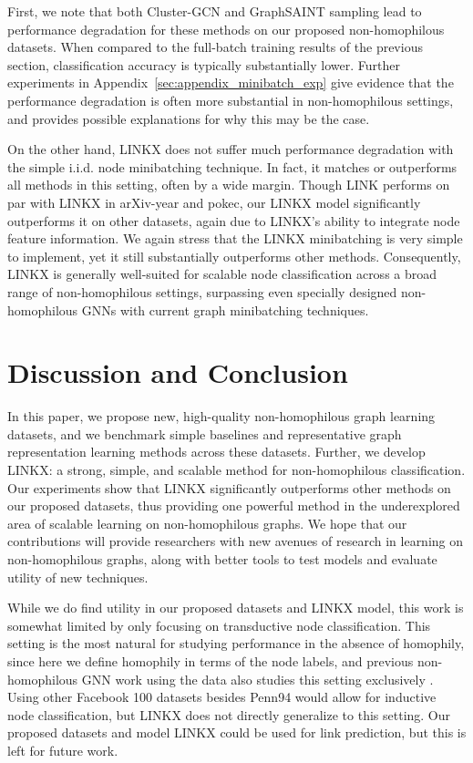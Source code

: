 \documentclass{article}
\begin{document}
First, we note that both Cluster-GCN and GraphSAINT sampling lead to performance degradation for these methods on our proposed non-homophilous datasets. When compared to the full-batch training results of the previous section, classification accuracy is typically substantially lower. Further experiments in Appendix~\ref{sec:appendix_minibatch_exp} give evidence that the performance degradation is often more substantial in non-homophilous settings, and provides possible explanations for why this may be the case.

On the other hand, LINKX does not suffer much performance degradation with the simple i.i.d. node minibatching technique. In fact, it matches or outperforms all methods in this setting, often by a wide margin. Though LINK performs on par with LINKX in arXiv-year and pokec, our LINKX model significantly outperforms it on other datasets, again due to LINKX's ability to integrate node feature information. We again stress that the LINKX minibatching is very simple to implement, yet it still substantially outperforms other methods. Consequently, LINKX is generally well-suited for scalable node classification across a broad range of non-homophilous settings, surpassing even specially designed non-homophilous GNNs with current graph minibatching techniques. 





\section{Discussion and Conclusion}\label{sec:conclusion}

In this paper, we propose new, high-quality non-homophilous graph learning datasets, and we benchmark simple baselines and representative graph representation learning methods across these datasets. Further, we develop LINKX: a strong, simple, and scalable method for non-homophilous classification. Our experiments show that LINKX significantly outperforms other methods on our proposed datasets, thus providing one powerful method in the underexplored area of scalable learning on non-homophilous graphs.
We hope that our contributions will provide researchers with new avenues of research in learning on non-homophilous graphs, along with better tools to test models and evaluate utility of new techniques.

While we do find utility in our proposed datasets and LINKX model, this work is somewhat limited by only focusing on transductive node classification. This setting is the most natural for studying performance in the absence of homophily, since here we define homophily in terms of the node labels, and previous non-homophilous GNN work using the \citet{pei2019geom} data also studies this setting exclusively \cite{zhu2020beyond, chien2021adaptive}. Using other Facebook 100 datasets besides Penn94 \cite{traud2012social} would allow for inductive node classification, but LINKX does not directly generalize to this setting. Our proposed datasets and model LINKX could be used for link prediction, but this is left for future work.
\end{document}
